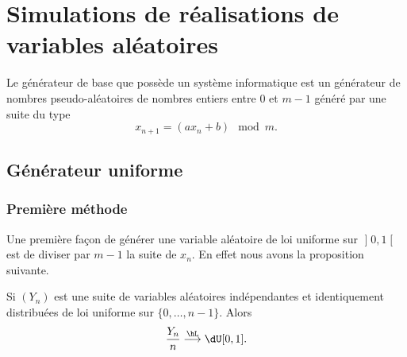 \section{Simulations de réalisations de variables aléatoires}

Le générateur de base que possède un système informatique est un générateur de nombres pseudo-aléatoires de nombres entiers entre \( 0\) et \( m-1\) généré par une suite du type
\begin{equation}
    x_{n+1}=(ax_n+b)\mod m.
\end{equation}

\subsection{Générateur uniforme}

\subsubsection{Première méthode}

Une première façon de générer une variable aléatoire de loi uniforme sur \( \mathopen] 0 , 1 \mathclose[\) est de diviser par \( m-1\) la suite de \( x_n\). En effet nous avons la proposition suivante.

\begin{proposition}
    Si \( (Y_n)\) est une suite de variables aléatoires indépendantes et identiquement distribuées de loi uniforme sur \( \{ 0,\ldots,n-1 \}\). Alors
    \begin{equation}
        \frac{ Y_n }{ n }\stackrel{\hL}{\longrightarrow}\dU\mathopen[ 0 , 1 \mathclose].
    \end{equation}
\end{proposition}

